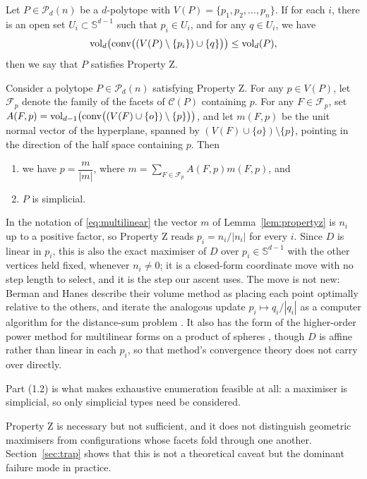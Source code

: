 \begin{definition}
  \label{def:propertyz}
  Let $P\in\mathcal{P}_{d}(n)$ be a $d$-polytope with
  $V(P)=\{p_{1},p_{2},\ldots,p_{n}\}$. If for each $i$, there is an open set
  $U_{i}\subset\mathbb{S}^{d-1}$ such that $p_{i}\in U_{i}$, and for any
  $q\in U_{i}$, we have
  \begin{equation*}
    \operatorname{vol}_{d}\bigl(\operatorname{conv}\bigl((V(P)\setminus\{p_{i}\})\cup\{q\}\bigr)\bigr)
      \leq \operatorname{vol}_{d}(P),
  \end{equation*}
  then we say that $P$ satisfies Property Z.
\end{definition}

\begin{lemma}
  \label{lem:propertyz}
  Consider a polytope $P\in\mathcal{P}_{d}(n)$ satisfying Property Z. For any
  $p\in V(P)$, let $\mathcal{F}_{p}$ denote the family of the facets of
  $\mathcal{C}(P)$ containing $p$. For any $F\in\mathcal{F}_{p}$, set
  $A(F,p)=\operatorname{vol}_{d-1}\bigl(\operatorname{conv}\bigl((V(F)\cup\{o\})\setminus\{p\}\bigr)\bigr)$,
  and let $m(F,p)$ be the unit normal vector of the hyperplane, spanned by
  $(V(F)\cup\{o\})\setminus\{p\}$, pointing in the direction of the half space
  containing $p$. Then
  \begin{enumerate}
    \item[(1.1)] we have $p=\dfrac{m}{|m|}$, where
      $m=\sum_{F\in\mathcal{F}_{p}}A(F,p)m(F,p)$, and
    \item[(1.2)] $P$ is simplicial.
  \end{enumerate}
\end{lemma}

In the notation of \eqref{eq:multilinear} the vector $m$ of
Lemma~\ref{lem:propertyz} is $n_{i}$ up to a positive factor, so Property Z
reads $p_{i} = n_{i}/|n_{i}|$ for every $i$. Since $D$ is linear in $p_{i}$,
this is also the exact maximiser of $D$ over $p_{i} \in \mathbb{S}^{d-1}$ with
the other vertices held fixed, whenever $n_{i} \neq 0$; it is a closed-form
coordinate move with no step length to select, and it is the step our ascent
uses. The move is not new: Berman and Hanes describe their volume method as
placing each point optimally relative to the others, and iterate the analogous
update $p_{i} \mapsto q_{i}/|q_{i}|$ as a computer algorithm for the
distance-sum problem \cite{berman-hanes-1977}. It also has the form of the
higher-order power method for multilinear forms on a product of spheres
\cite{de-lathauwer-2000}, though $D$ is affine rather than linear in each
$p_{i}$, so that method's convergence theory does not carry over directly.

Part (1.2) is what makes exhaustive enumeration feasible at all: a maximiser is
simplicial, so only simplicial types need be considered.

Property Z is necessary but not sufficient, and it does not distinguish
geometric maximisers from configurations whose facets fold through one another.
Section~\ref{sec:trap} shows that this is not a theoretical caveat but the
dominant failure mode in practice.
